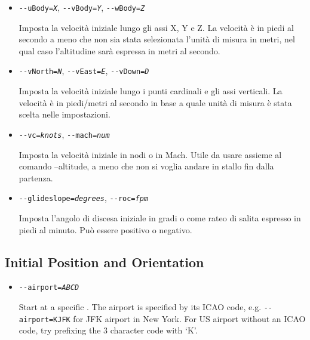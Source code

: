 \begin{itemize}
{\begin{itemize}
  Set the initial  of the aircraft. All values default to 0 - heading North, in straight and level flight.

  \item{\texttt{-$ $-uBody={\it X}}, \texttt{-$ $-vBody={\it Y}}, \texttt{-$ $-wBody={\it Z}}}

  Imposta la velocit\`{a} iniziale lungo gli assi X, Y e Z. La velocit\`{a} \`{e} in piedi al secondo a meno che non
  sia stata selezionata l'unit\`{a} di misura in metri, nel qual caso l'altitudine sar\`{a} espressa in metri al secondo.

  \item{\texttt{-$ $-vNorth={\it N}}, \texttt{-$ $-vEast={\it E}}, \texttt{-$ $-vDown={\it D}}}

  Imposta la velocit\`{a} iniziale lungo i punti cardinali e gli assi verticali.
  La velocit\`{a} \`{e} in piedi/metri al secondo in base a quale unit\`{a} di misura \`{e} stata scelta nelle impostazioni.

  \item{\texttt{-$ $-vc={\it knots}}, \texttt{-$ $-mach={\it num}}}

  Imposta la velocit\`{a} iniziale in nodi o in Mach. Utile da usare assieme al comando --altitude, a meno che non
  si voglia andare in stallo fin dalla partenza.

  \item{\texttt{-$ $-glideslope={\it degrees}}, \texttt{-$ $-roc={\it fpm}}}

  Imposta l'angolo di discesa iniziale in gradi o come rateo di salita espresso in piedi al minuto.
  Pu\`{o} essere positivo o negativo.

  \end{itemize}
}
{
  \subsection{Initial Position and Orientation\label{aiportid}}
  \begin{itemize}
  \item{\texttt{-$ $-airport={\it ABCD}}}

  Start at a specific . The airport is specified by its ICAO code, e.g. \texttt{-$ $-airport=KJFK} for
  JFK airport in New York. For US airport without an ICAO code, try prefixing the 3 character code
  with `K'.


\end{itemize}}
\end{itemize}
